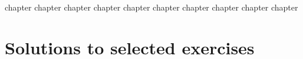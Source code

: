 {chapter}
{chapter}
{chapter}
{chapter}
{chapter}
{chapter}
{chapter}
{chapter}
{chapter}
{chapter}


\chapter{Solutions to selected exercises}
\printsolutions
